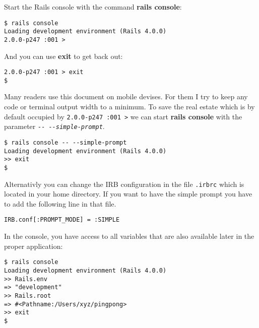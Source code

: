 \documentclass[a4paper]{book}
\begin{document}
Start the Rails console with the command \textbf{rails console}:

\begin{shaded}\begin{verbatim}
$ rails console
Loading development environment (Rails 4.0.0)
2.0.0-p247 :001 >
\end{verbatim}\end{shaded}

And you can use \textbf{exit} to get back out:

\begin{shaded}\begin{verbatim}
2.0.0-p247 :001 > exit
$
\end{verbatim}\end{shaded}

Many readers use this document on mobile devises. For them I try to keep any code or terminal output width to a minimum. To save the real estate which is by default occupied by \texttt{2.0.0-p247 :001 \textgreater{}} we can start \textbf{rails console} with the parameter \emph{\texttt{-{}- -{}-simple-prompt}}.

\begin{shaded}\begin{verbatim}
$ rails console -- --simple-prompt
Loading development environment (Rails 4.0.0)
>> exit
$
\end{verbatim}\end{shaded}

Alternativly you can change the IRB configuration in the file \texttt{.irbrc} which is located in your home directory. If you want to have the simple prompt you have to add the following line in that file.

\begin{shaded}\begin{verbatim}
IRB.conf[:PROMPT_MODE] = :SIMPLE
\end{verbatim}\end{shaded}

In the console, you have access to all variables that are also available later in the proper application:

\begin{shaded}\begin{verbatim}
$ rails console
Loading development environment (Rails 4.0.0)
>> Rails.env
=> "development"
>> Rails.root
=> #<Pathname:/Users/xyz/pingpong>
>> exit
$
\end{verbatim}\end{shaded}
\end{document}
